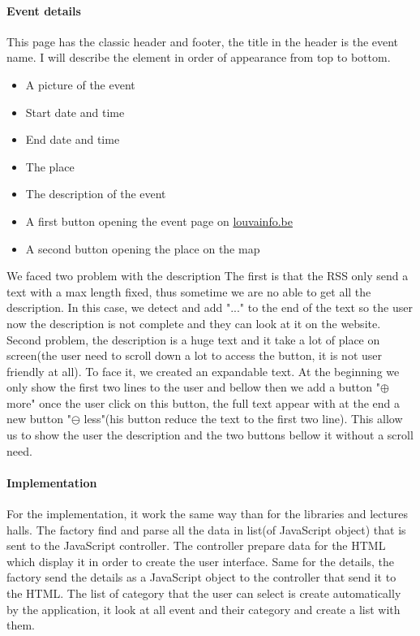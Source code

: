 \documentclass[11pt, a4paper]{report}
\begin{document}
\paragraph{Event details} This page has the classic header and footer, the title in the header is the event name. I will describe the element in order of appearance from top to bottom.
\begin{itemize}
\item A picture of the event
\item Start date and time 
\item End date and time
\item The place
\item The description of the event
\item A first button opening the event page on \url{louvainfo.be}
\item A second button opening the place on the map
\end{itemize}
We faced two problem with the description The first is that the RSS only send a text with a max length fixed, thus sometime we are no able to get all the description. In this case, we detect and add "..." to the end of the text so the user now the description is not complete and they can look at it on the website. Second problem, the description is a huge text and it take a lot of place on screen(the user need to scroll down a lot to access the button, it is not user friendly at all). To face it, we created an expandable text. At the beginning we only show the first two lines to the user and bellow then we add a button "$\oplus$ more" once the user click on this button, the full text appear with at the end a new button "$\ominus$ less"(his button reduce the text to the first two line). This allow us to show the user the description and the two buttons bellow it without a scroll need.
\paragraph{Implementation}
For the implementation, it work the same way than for the libraries and lectures halls. The factory find and parse all the data in list(of JavaScript object) that is sent to the JavaScript controller. The controller prepare data for the HTML which display it in order to create the user interface. Same for the details, the factory send the details as a JavaScript object to the controller that send it to the HTML. The list of category that the user can select is create automatically by the application, it look at all event and their category and create a list with them. 
\end{document}
